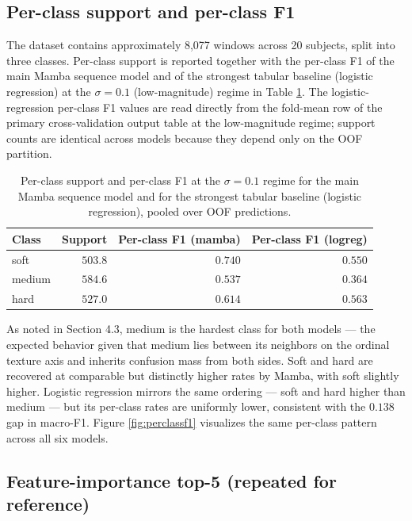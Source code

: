 \documentclass{article}
\begin{document}
\subsection{Per-class support and per-class F1}

The dataset contains approximately 8,077 windows across 20 subjects, split into three classes. Per-class support is reported together with the per-class F1 of the main Mamba sequence model and of the strongest tabular baseline (logistic regression) at the $\sigma = 0.1$ (low-magnitude) regime in Table \ref{tab:perclass}. The logistic-regression per-class F1 values are read directly from the fold-mean row of the primary cross-validation output table at the low-magnitude regime; support counts are identical across models because they depend only on the OOF partition.

\begin{table}[htbp]
\centering
\caption{Per-class support and per-class F1 at the $\sigma = 0.1$ regime for the main Mamba sequence model and for the strongest tabular baseline (logistic regression), pooled over OOF predictions.}
\label{tab:perclass}
\begin{tabular}{l r r r}
\toprule
Class & Support & Per-class F1 (mamba) & Per-class F1 (logreg) \\
\midrule
soft & $503.8$ & $0.740$ & $0.550$ \\
medium & $584.6$ & $0.537$ & $0.364$ \\
hard & $527.0$ & $0.614$ & $0.563$ \\
\bottomrule
\end{tabular}
\end{table}

As noted in Section 4.3, medium is the hardest class for both models --- the expected behavior given that medium lies between its neighbors on the ordinal texture axis and inherits confusion mass from both sides. Soft and hard are recovered at comparable but distinctly higher rates by Mamba, with soft slightly higher. Logistic regression mirrors the same ordering --- soft and hard higher than medium --- but its per-class rates are uniformly lower, consistent with the $0.138$ gap in macro-F1. Figure \ref{fig:perclassf1} visualizes the same per-class pattern across all six models.

\subsection{Feature-importance top-5 (repeated for reference)}
\end{document}
